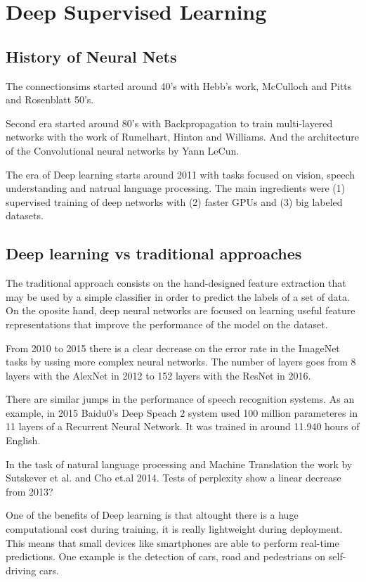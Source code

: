 \documentclass[b5paper]{report}
\begin{document}
\section{Deep Supervised Learning}

\subsection{History of Neural Nets}

The connectionsims started around 40's with Hebb's work, McCulloch and Pitts
and Rosenblatt 50's.

Second era started around 80's with Backpropagation to train multi-layered
networks with the work of Rumelhart, Hinton and Williams. And the architecture
of the Convolutional neural networks by Yann LeCun.

The era of Deep learning starts around 2011 with tasks focused on vision,
speech understanding and natrual language processing. The main ingredients
were (1) supervised training of deep networks with (2) faster GPUs and (3) big
labeled datasets.


\subsection{Deep learning vs traditional approaches}

The traditional approach consists on the hand-designed feature extraction that
may be used by a simple classifier in order to predict the labels of a set of
data. On the oposite hand, deep neural networks are focused on learning useful
feature representations that improve the performance of the model on the
dataset.

From 2010 to 2015 there is a clear decrease on the error rate in the ImageNet
tasks by ussing more complex neural networks. The number of layers goes from 8
layers with the AlexNet in 2012 to 152 layers with the ResNet in 2016.

There are similar jumps in the performance of speech recognition systems. As an
example, in 2015 Baidu0's Deep Speach 2 system used 100 million parameteres in
11 layers of a Recurrent Neural Network. It was trained in around 11.940 hours
of English.

In the task of natural language processing and Machine Translation the work by
Sutskever et al. and Cho et.al 2014. Tests of perplexity show a linear decrease
from 2013?

One of the benefits of Deep learning is that altought there is a huge
computational cost during training, it is really lightweight during deployment.
This means that small devices like smartphones are able to perform real-time
predictions. One example is the detection of cars, road and pedestrians on
self-driving cars.
\end{document}
